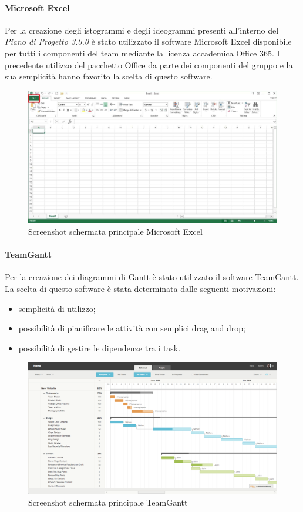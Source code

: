 \paragraph{Microsoft Excel}
Per la creazione degli istogrammi e degli ideogrammi presenti all'interno del \textit{Piano di Progetto 3.0.0\doc} è stato utilizzato il software Microsoft Excel disponibile per tutti i componenti del team mediante la licenza accademica Office 365. Il precedente utilizzo del pacchetto Office da parte dei componenti del gruppo e la sua semplicità hanno favorito la scelta di questo software.
\begin{figure}[h!]
	\caption{Screenshot schermata principale Microsoft Excel}
	\centering
	\includegraphics[width=\textwidth]{res/img/excelScreenshot.jpg}
\end{figure}
\newpage
\paragraph{TeamGantt}
Per la creazione dei diagrammi di Gantt è stato utilizzato il software TeamGantt. La scelta di questo software è stata determinata dalle seguenti motivazioni:
\begin{itemize}
	\item semplicità di utilizzo;
	\item possibilità di pianificare le attività con semplici drag and drop;
	\item possibilità di gestire le dipendenze tra i task.
\end{itemize}
\begin{figure}[h!]
	\caption{Screenshot schermata principale TeamGantt}
	\centering
	\includegraphics[width=\textwidth]{res/img/teamganttScreenshot.png}
\end{figure}
